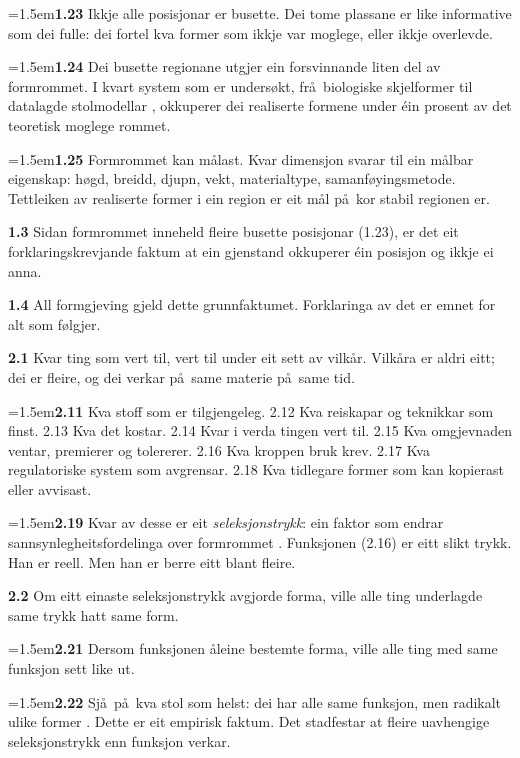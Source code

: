 \documentclass[11pt, a4paper]{article}
\newcommand{\prop}[1]{\bigskip\noindent{\Large\textbf{#1}}\medskip\par}
\newcommand{\subprop}[1]{\medskip\noindent\textbf{#1}\quad}
\newcommand{\subsubprop}[1]{\smallskip\hangindent=1.5em\noindent\hspace{1.5em}\textbf{#1}\quad}
\begin{document}
\subsubprop{1.23} Ikkje alle posisjonar er busette. Dei tome plassane er like informative som dei fulle: dei fortel kva former som ikkje var moglege, eller ikkje overlevde.

\subsubprop{1.24} Dei busette regionane utgjer ein forsvinnande liten del av formrommet. I kvart system som er unders\o kt, fr\aa\ biologiske skjelformer \citep{raup1966} til datalagde stolmodellar \citep{finne2026}, okkuperer dei realiserte formene under \'ein prosent av det teoretisk moglege rommet.

\subsubprop{1.25} Formrommet kan m\aa last. Kvar dimensjon svarar til ein m\aa lbar eigenskap: h\o gd, breidd, djupn, vekt, materialtype, samanf\o yingsmetode. Tettleiken av realiserte former i ein region er eit m\aa l p\aa\ kor stabil regionen er.

\subprop{1.3} Sidan formrommet inneheld fleire busette posisjonar (1.23), er det eit forklaringskrevjande faktum at ein gjenstand okkuperer \'ein posisjon og ikkje ei anna.

\subprop{1.4} All formgjeving gjeld dette grunnfaktumet. Forklaringa av det er emnet for alt som f\o lgjer.

\prop{2 Forma er bestemt av mange krefter samstundes.}

\subprop{2.1} Kvar ting som vert til, vert til under eit sett av vilk\aa r. Vilk\aa ra er aldri eitt; dei er fleire, og dei verkar p\aa\ same materie p\aa\ same tid.

\subsubprop{2.11} Kva stoff som er tilgjengeleg. 2.12 Kva reiskapar og teknikkar som finst. 2.13 Kva det kostar. 2.14 Kvar i verda tingen vert til. 2.15 Kva omgjevnaden ventar, premierer og tolererer. 2.16 Kva kroppen bruk krev. 2.17 Kva regulatoriske system som avgrensar. 2.18 Kva tidlegare former som kan kopierast eller avvisast.

\subsubprop{2.19} Kvar av desse er eit \textit{seleksjonstrykk}: ein faktor som endrar sannsynlegheitsfordelinga over formrommet \citep[jf.][]{wright1932, kauffman1993}. Funksjonen (2.16) er eitt slikt trykk. Han er reell. Men han er berre eitt blant fleire.

\subprop{2.2} Om eitt einaste seleksjonstrykk avgjorde forma, ville alle ting underlagde same trykk hatt same form.

\subsubprop{2.21} Dersom funksjonen \aa leine bestemte forma, ville alle ting med same funksjon sett like ut.

\subsubprop{2.22} Sj\aa\ p\aa\ kva stol som helst: dei har alle same funksjon, men radikalt ulike former \citep[sjå][for ei systematisk oversikt]{fiell2012}. Dette er eit empirisk faktum. Det stadfestar at fleire uavhengige seleksjonstrykk enn funksjon verkar.
\end{document}

